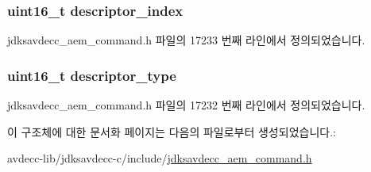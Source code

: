\subsubsection[{\texorpdfstring{descriptor\+\_\+index}{descriptor_index}}]{\setlength{\rightskip}{0pt plus 5cm}uint16\+\_\+t descriptor\+\_\+index}\hypertarget{structjdksavdecc__aem__command__get__control_a042bbc76d835b82d27c1932431ee38d4}{}\label{structjdksavdecc__aem__command__get__control_a042bbc76d835b82d27c1932431ee38d4}


jdksavdecc\+\_\+aem\+\_\+command.\+h 파일의 17233 번째 라인에서 정의되었습니다.

\subsubsection[{\texorpdfstring{descriptor\+\_\+type}{descriptor_type}}]{\setlength{\rightskip}{0pt plus 5cm}uint16\+\_\+t descriptor\+\_\+type}\hypertarget{structjdksavdecc__aem__command__get__control_ab7c32b6c7131c13d4ea3b7ee2f09b78d}{}\label{structjdksavdecc__aem__command__get__control_ab7c32b6c7131c13d4ea3b7ee2f09b78d}


jdksavdecc\+\_\+aem\+\_\+command.\+h 파일의 17232 번째 라인에서 정의되었습니다.



이 구조체에 대한 문서화 페이지는 다음의 파일로부터 생성되었습니다.\+:\begin{DoxyCompactItemize}
\item 
avdecc-\/lib/jdksavdecc-\/c/include/\hyperlink{jdksavdecc__aem__command_8h}{jdksavdecc\+\_\+aem\+\_\+command.\+h}\end{DoxyCompactItemize}
